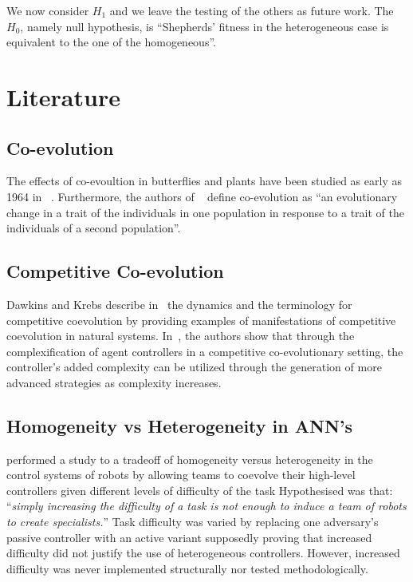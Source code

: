 \documentclass[conference]{IEEEtran}
\begin{document}
We now consider $H_1$ and we leave the testing of the others as future work. 
The $H_0$, namely null hypothesis, is ``Shepherds’ fitness in the heterogeneous case is equivalent to the one of the homogeneous''.

\section{Literature}
 
\subsection{Co-evolution}
The effects of co-evoultion in butterflies and plants have been studied as early as 1964 in ~\cite{ehrlich1964butterflies}.
Furthermore, the authors of ~\cite{janzen1980coevolution} define co-evolution as ``an evolutionary change in a trait of the individuals in one population in response to a trait of the individuals of a second population''.


\subsection{Competitive Co-evolution}
Dawkins and Krebs describe in~\cite{dawkins1979arms} the dynamics and the terminology for competitive coevolution by providing examples of manifestations of competitive coevolution in natural systems.
In~\cite{stanley2004competitive}, the authors show that through the complexification of agent controllers in a competitive co-evolutionary setting, the controller's added complexity can be utilized through the generation of more advanced strategies as complexity increases.


\subsection{Homogeneity vs Heterogeneity in ANN's}
\cite{potter2001heterogeneity} performed a study to a tradeoff of homogeneity versus heterogeneity in the control systems of robots by allowing teams to coevolve their high-level controllers given different levels of difficulty of the task
Hypothesised was that: ``\textit{simply increasing the difficulty of a task is not enough to induce a team of robots to create specialists.}''
Task difficulty was varied by replacing one adversary's passive controller with an active variant supposedly proving that increased difficulty did not justify the use of heterogeneous controllers.
However, increased difficulty was never implemented structurally nor tested methodologically. 
\end{document}
